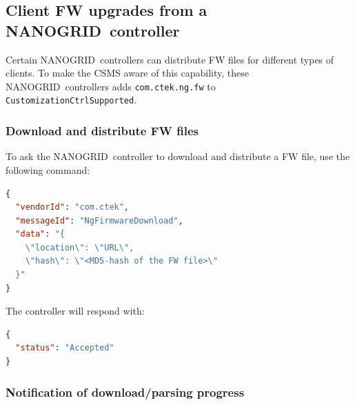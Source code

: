 \documentclass{scrartcl}
\newcommand{\nanogrid}{NANOGRID\texttrademark}
\begin{document}
\subsection{Client FW upgrades from a \nanogrid\ controller}
\label{sec:client-fw-upgrades}

Certain \nanogrid\ controllers can distribute FW files for different types of
clients. To make the CSMS aware of this capability, these \nanogrid\
controllers adds \verb|com.ctek.ng.fw| to\\
\verb|CustomizationCtrlSupported|.

\subsubsection{Download and distribute FW files}
\label{sec:downl-distr-fw}

To ask the \nanogrid\ controller to download and distribute a FW file, use the
following command:
\begin{lstlisting}[language=json,caption={DataTransfer.req for download of FW
files sent to the CS},captionpos=t]
{
  "vendorId": "com.ctek",
  "messageId": "NgFirmwareDownload",
  "data": "{
    \"location\": \"URL\",
    \"hash\": \"<MD5-hash of the FW file>\"
  }"
}
\end{lstlisting}

The controller will respond with:
\begin{lstlisting}[language=json,caption={DataTransfer.conf for download of FW
files sent from the CS},captionpos=t]
{
  "status": "Accepted"
}
\end{lstlisting}

\subsubsection{Notification of download/parsing progress}
\label{sec:notif-downl-progr}
\end{document}
